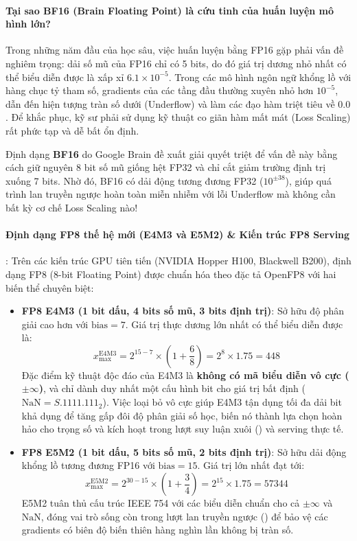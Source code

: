\paragraph{Tại sao BF16 (Brain Floating Point) là cứu tinh của huấn luyện mô hình lớn?}
Trong những năm đầu của học sâu, việc huấn luyện bằng FP16 gặp phải vấn đề nghiêm trọng: dải số mũ của FP16 chỉ có 5 bits, do đó giá trị dương nhỏ nhất có thể biểu diễn được là xấp xỉ $6.1 \times 10^{-5}$. Trong các mô hình ngôn ngữ khổng lồ với hàng chục tỷ tham số, gradients của các tầng đầu thường xuyên nhỏ hơn $10^{-5}$, dẫn đến hiện tượng tràn số dưới (Underflow) và làm các đạo hàm triệt tiêu về $0.0$. Để khắc phục, kỹ sư phải sử dụng kỹ thuật co giãn hàm mất mát (Loss Scaling) rất phức tạp và dễ bất ổn định.

Định dạng \textbf{BF16} do Google Brain đề xuất giải quyết triệt để vấn đề này bằng cách giữ nguyên 8 bit số mũ giống hệt FP32 và chỉ cắt giảm trường định trị xuống 7 bits. Nhờ đó, BF16 có dải động tương đương FP32 ($10^{\pm 38}$), giúp quá trình lan truyền ngược hoàn toàn miễn nhiễm với lỗi Underflow mà không cần bất kỳ cơ chế Loss Scaling nào!

\paragraph{Định dạng FP8 thế hệ mới (E4M3 và E5M2) \& Kiến trúc FP8 Serving}:
Trên các kiến trúc GPU tiên tiến (NVIDIA Hopper H100, Blackwell B200), định dạng FP8 (8-bit Floating Point) được chuẩn hóa theo đặc tả OpenFP8 với hai biến thể chuyên biệt:
\begin{itemize}
  \item \textbf{FP8 E4M3 (1 bit dấu, 4 bits số mũ, 3 bits định trị)}:
  Sở hữu độ phân giải cao hơn với $\text{bias} = 7$. Giá trị thực dương lớn nhất có thể biểu diễn được là:
  \begin{equation}
  x_{\max}^{\text{E4M3}} = 2^{15 - 7} \times \left(1 + \frac{6}{8}\right) = 2^8 \times 1.75 = 448
  \end{equation}
  Đặc điểm kỹ thuật độc đáo của E4M3 là \textbf{không có mã biểu diễn vô cực ($\pm \infty$)}, và chỉ dành duy nhất một cấu hình bit cho giá trị bất định ($\text{NaN} = S.1111.111_2$). Việc loại bỏ vô cực giúp E4M3 tận dụng tối đa dải bit khả dụng để tăng gấp đôi độ phân giải số học, biến nó thành lựa chọn hoàn hảo cho trọng số và kích hoạt trong lượt suy luận xuôi () và serving thực tế.
  \item \textbf{FP8 E5M2 (1 bit dấu, 5 bits số mũ, 2 bits định trị)}:
  Sở hữu dải động khổng lồ tương đương FP16 với $\text{bias} = 15$. Giá trị lớn nhất đạt tới:
  \begin{equation}
  x_{\max}^{\text{E5M2}} = 2^{30 - 15} \times \left(1 + \frac{3}{4}\right) = 2^{15} \times 1.75 = 57344
  \end{equation}
  E5M2 tuân thủ cấu trúc IEEE 754 với các biểu diễn chuẩn cho cả $\pm \infty$ và $\text{NaN}$, đóng vai trò sống còn trong lượt lan truyền ngược () để bảo vệ các gradients có biên độ biến thiên hàng nghìn lần không bị tràn số.
\end{itemize}

